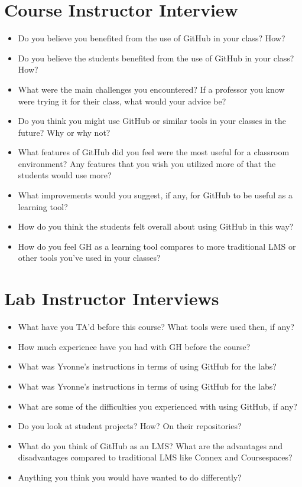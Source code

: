 \section{Course Instructor Interview}
\begin{itemize}
    \item Do you believe you benefited from the use of GitHub in your class? How?
    \item Do you believe the students benefited from the use of GitHub in your class? How?
    \item What were the main challenges you encountered? If a professor you know were trying it for their class, what would your advice be?
    \item Do you think you might use GitHub or similar tools in your classes in the future? Why or why not?
    \item What features of GitHub did you feel were the most useful for a classroom environment? Any features that you wish you utilized more of that the students would use more?
    \item What improvements would you suggest, if any, for GitHub to be useful as a learning tool?
    \item How do you think the students felt overall about using GitHub in this way?
    \item How do you feel GH as a learning tool compares to more traditional LMS or other tools you've used in your classes?
\end{itemize}

\section{Lab Instructor Interviews}
\begin{itemize}
    \item What have you TA'd before this course? What tools were used then, if any?
    \item How much experience have you had with GH before the course?
    \item What was Yvonne's instructions in terms of using GitHub for the labs?
    \item What was Yvonne's instructions in terms of using GitHub for the labs?
    \item What are some of the difficulties you experienced with using GitHub, if any?
    \item Do you look at student projects? How? On their repositories?
    \item What do you think of GitHub as an LMS? What are the advantages and disadvantages compared to traditional LMS like Connex and Coursespaces?
    \item Anything you think you would have wanted to do differently?
\end{itemize}

